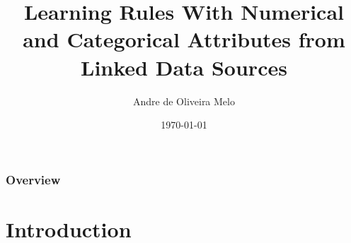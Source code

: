 \documentclass{beamer}
\title[]{Learning Rules With Numerical and Categorical
Attributes from Linked Data Sources} %
\author{Andre de Oliveira Melo} %
\institute[Saarland University] %
{
Saarland University \\ %
\medskip
\textit{andresony@gmail.com} %
}
\date{\today} %
\begin{document}
\begin{frame}
\titlepage %
\end{frame}

\begin{frame}
\frametitle{Overview} %
\tableofcontents %
\end{frame}


\section{Introduction}
\end{document}
